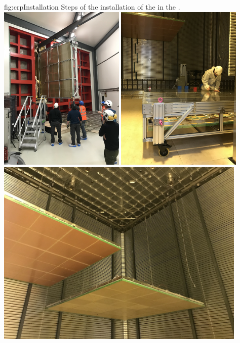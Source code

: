 \begin{dunefigure}{fig:crpInstallation}
{Steps of the installation of the  in the .}
\includegraphics[width=0.45\textwidth]{graphics/crpInsertion.jpg}
\includegraphics[width=0.45\textwidth]{graphics/crpMoving.jpg}
\includegraphics[width=0.9\textwidth]{graphics/crpLifting.jpg}
\end{dunefigure}

